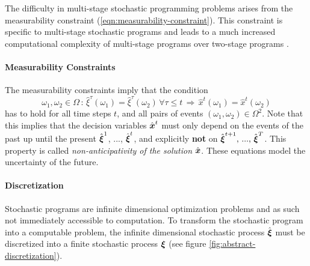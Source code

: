 The difficulty in multi-stage stochastic programming problems arises from the measurability constraint (\ref{eqn:measurability-constraint}).
This constraint is specific to multi-stage stochastic programs and leads to a much increased computational complexity of multi-stage programs over two-stage programs \cite{Shapiro2005,Shapiro2008}.
%
\paragraph{Measurability Constraints}
The measurability constraints imply that the condition
\begin{equation}
  \label{eq:mathematical-NAC}
  \omega_1,\omega_2\in \Omega \, : \, \hat{\xi}^\tau(\omega_1) = \hat{\xi}^\tau(\omega_2)\,\forall \tau\leq t\,\Rightarrow \,  \hat{x}^t(\omega_1) =  \hat{x}^t(\omega_2)
\end{equation}
has to hold for all time steps $t$, and all pairs of events $(\omega_1,\omega_2)\in\Omega^2$.
Note that this implies that the decision variables $\hat{\boldsymbol x}^t$ must only depend on the events of the past up until the present $\hat{\boldsymbol\xi}^1$, ..., $\hat{\boldsymbol\xi}^t$, and explicitly \textbf{not} on $\hat{\boldsymbol\xi}^{t+1},\, ...,\,\hat{\boldsymbol\xi}^T$.
This property is called \textit{non-anticipativity of the solution} $\hat{\boldsymbol x}$.
These equations model the uncertainty of the future.
%
\paragraph{Discretization}
%
Stochastic programs are infinite dimensional optimization problems and as such not immediately accessible to computation.
To transform the stochastic program into a computable problem, the infinite dimensional stochastic process $\hat{\boldsymbol\xi}$ must be discretized into a finite stochastic process $\boldsymbol\xi$ (see figure \ref{fig:abstract-discretization}).


